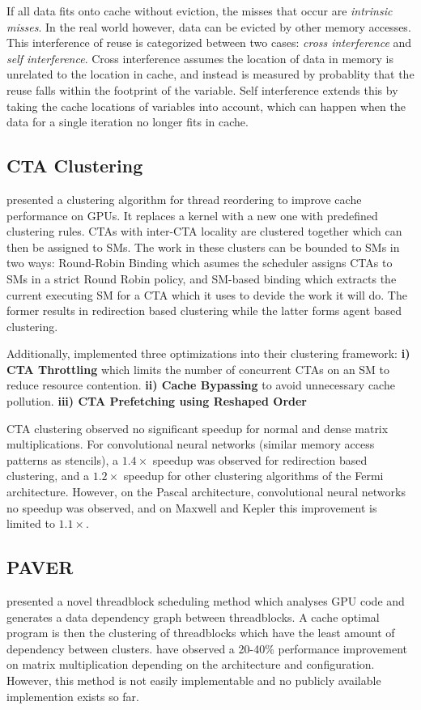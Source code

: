 If all data fits onto cache without eviction, the misses that occur are \textit{intrinsic misses}.
In the real world however, data can be evicted by other memory accesses.
This interference of reuse is categorized between two cases: \textit{cross interference} and \textit{self interference}.
Cross interference assumes the location of data in memory is unrelated to the location in cache, and instead is measured by probablity that the reuse falls within the footprint of the variable.
Self interference extends this by taking the cache locations of variables into account, which can happen when the data for a single iteration no longer fits in cache.

\subsection{CTA Clustering}
\citet{li2017locality} presented a clustering algorithm for thread reordering to improve cache performance on GPUs.
It replaces a kernel with a new one with predefined clustering rules.
CTAs with inter-CTA locality are clustered together which can then be assigned to SMs.
The work in these clusters can be bounded to SMs in two ways:
Round-Robin Binding which asumes the scheduler assigns CTAs to SMs in a strict Round Robin policy, and SM-based binding which extracts the current executing SM for a CTA which it uses to devide the work it will do.
The former results in redirection based clustering while the latter forms agent based clustering.

Additionally, \citeauthor{li2017locality} implemented three optimizations into their clustering framework: 
\textbf{i) CTA Throttling} which limits the number of concurrent CTAs on an SM to reduce resource contention.
\textbf{ii) Cache Bypassing} to avoid unnecessary cache pollution.
\textbf{iii) CTA Prefetching using Reshaped Order}

CTA clustering observed no significant speedup for normal and dense matrix multiplications.
For convolutional neural networks (similar memory access patterns as stencils), a $1.4\times$ speedup was observed for redirection based clustering, and a $1.2\times$ speedup for other clustering algorithms of the Fermi architecture.
However, on the Pascal architecture, convolutional neural networks no speedup was observed, and on Maxwell and Kepler this improvement is limited to $1.1\times$.

\subsection{PAVER}
\citet{tripathy2021paver} presented a novel threadblock scheduling method which analyses GPU code and generates a data dependency graph between threadblocks. 
A cache optimal program is then the clustering of threadblocks which have the least amount of dependency between clusters.
\citeauthor{tripathy2021paver} have observed a 20-40\% performance improvement on matrix multiplication depending on the architecture and configuration.
However, this method is not easily implementable and no publicly available implemention exists so far.
